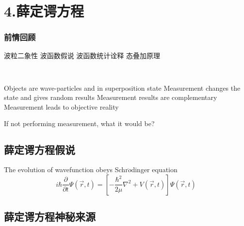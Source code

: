 
\section{4.薛定谔方程}

\begin{frame}
    \frametitle{前情回顾}
    \begin{itemize}
        \Item 波粒二象性
        \Item 波函数假说
        \Item 波函数统计诠释
        \Item 态叠加原理
    \end{itemize}
\end{frame}  

\begin{frame}
    \begin{tcolorbox4}[Conclusion]
        ~~\\
    \begin{enumerate}
        \Item Objects are wave-particles and in superposition state
        \Item Measurement changes the state and gives random results
        \Item Measurement results are complementary
        \Item Measurement leads to objective reality
    \end{enumerate}
    \end{tcolorbox4}
\end{frame}  

\begin{frame}
    \centering
    {
      If not performing measurement, what it would be? 
    }
\end{frame}

\subsection{薛定谔方程假说}

\begin{frame}
    \begin{tcolorbox4}
        The evolution of wavefunction obeys Schr$\ddot{o}$dinger equation
        \begin{equation*}
            i\hbar \frac{\partial }{\partial t} \Psi (\overrightarrow{r},t ) =\left [ -\frac{\hbar^2}{2\mu }\nabla ^2 + V(\overrightarrow{r},t ) \right ]\Psi (\overrightarrow{r}, t ) 
        \end{equation*}
    \end{tcolorbox4}
\end{frame}

\subsection{薛定谔方程神秘来源}

